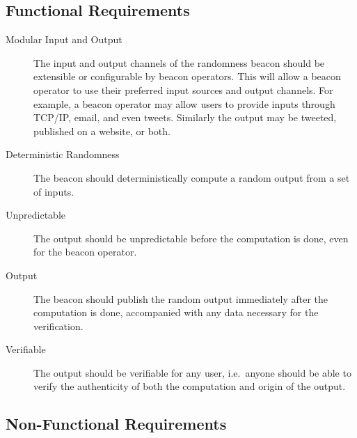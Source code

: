 \subsection{Functional Requirements}
\label{sub:functional_requirements}
\begin{description}
    \item[Modular Input and Output] The input and output channels of the randomness beacon should be extensible or configurable by beacon operators. This will allow a beacon operator to use their preferred input sources and output channels. For example, a beacon operator may allow users to provide inputs through TCP/IP, email, and even tweets. Similarly the output may be tweeted, published on a website, or both.

    \item[Deterministic Randomness] The beacon should deterministically compute a random output from a set of inputs. 

    \item[Unpredictable] The output should be unpredictable before the computation is done, even for the beacon operator.


    \item[Output] The beacon should publish the random output immediately after the computation is done, accompanied with any data necessary for the verification.

    \item[Verifiable] The output should be verifiable for any user, i.e.\ anyone should be able to verify the authenticity of both the computation and origin of the output.
\end{description}

\subsection{Non-Functional Requirements}
\label{sub:non_functional_requirements}

